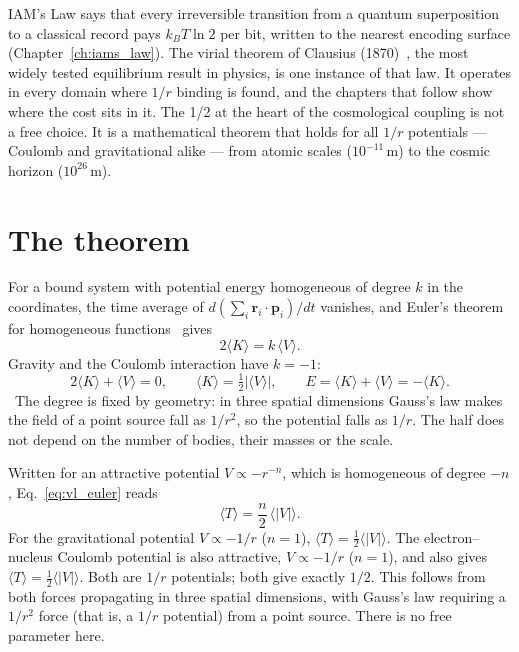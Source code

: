 IAM's Law says that every irreversible transition from a quantum superposition to a classical record pays $k_BT\ln2$ per bit, written to the nearest
encoding surface (Chapter~\ref{ch:iams_law}). The virial theorem of Clausius (1870)~\cite{Clausius1870}, the most widely tested equilibrium result in
physics, is one instance of that law. It operates in every domain where $1/r$ binding is found, and the chapters that follow show where the cost sits in it.
The 1/2 at the heart of the cosmological coupling is not a free choice. It is a mathematical theorem that holds for all $1/r$ potentials --- Coulomb and
gravitational alike --- from atomic scales ($10^{-11}$\,m) to the cosmic horizon ($10^{26}$\,m).

\section{The theorem}\label{sec:vl_theorem}
For a bound system with potential energy homogeneous of degree $k$ in the coordinates, the time average of $d(\sum_i\mathbf r_i\cdot\mathbf p_i)/dt$
vanishes, and Euler's theorem for homogeneous functions~\cite{Goldstein} gives
\begin{equation}
2\langle K\rangle=k\,\langle V\rangle .\label{eq:vl_euler}
\end{equation}
Gravity and the Coulomb interaction have $k=-1$:
\begin{equation}
2\langle K\rangle+\langle V\rangle=0,\qquad \langle K\rangle=\tfrac12|\langle V\rangle|,\qquad E=\langle K\rangle+\langle V\rangle=-\langle K\rangle .\label{eq:vl_virial}
\end{equation}
\derived\ The degree is fixed by geometry: in three spatial dimensions Gauss's law makes the field of a point source fall as $1/r^2$, so the potential falls as
$1/r$. The half does not depend on the number of bodies, their masses or the scale.

Written for an attractive potential $V\propto-r^{-n}$, which is homogeneous of degree $-n$, Eq.~\eqref{eq:vl_euler} reads
\begin{equation}
\langle T\rangle=\frac n2\,\langle|V|\rangle .\label{eq:vl_n}
\end{equation}
For the gravitational potential $V\propto-1/r$ ($n=1$), $\langle T\rangle=\tfrac12\langle|V|\rangle$. The electron--nucleus Coulomb potential is also
attractive, $V\propto-1/r$ ($n=1$), and also gives $\langle T\rangle=\tfrac12\langle|V|\rangle$. Both are $1/r$ potentials; both give exactly $1/2$. This follows
from both forces propagating in three spatial dimensions, with Gauss's law requiring a $1/r^2$ force (that is, a $1/r$ potential) from a point source. There
is no free parameter here. \derived{}

